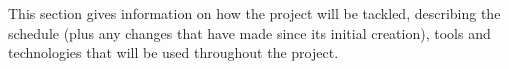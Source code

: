 This section gives information on how the project will be tackled, describing the schedule (plus any changes that have made since its initial creation), tools and technologies that will be used throughout the project.
